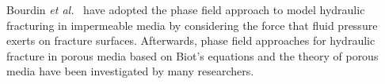 
Bourdin \emph{et al.}~\cite{bourdin2012variational} have adopted the phase field approach to model hydraulic fracturing in impermeable media by considering the force that fluid pressure exerts on fracture surfaces. Afterwards, phase field
approaches for hydraulic fracture in porous media based on Biot's equations and the theory of porous media have been investigated by many researchers. %


